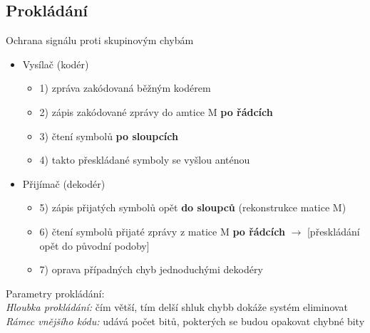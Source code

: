 \subsection{Prokládání}
Ochrana signálu proti skupinovým chybám
\begin{itemize}
	\item Vysílač (kodér)
	\begin{itemize}
		\item 1) zpráva zakódovaná běžným kodérem
		\item 2) zápis zakódované zprávy do amtice M \textbf{po řádcích}
		\item 3) čtení symbolů \textbf{po sloupcích}
		\item 4) takto přeskládané symboly se vyšlou anténou
	\end{itemize}
	\item Přijímač (dekodér)
	\begin{itemize}
		\item 5) zápis přijatých symbolů opět \textbf{do sloupců} (rekonstrukce matice M)
		\item 6) čtení symbolů přijaté zprávy z matice M \textbf{po řádcích} $\rightarrow$ [přeskládání opět do původní podoby]
		\item 7) oprava případných chyb jednoduchými dekodéry
	\end{itemize}
\end{itemize}
Parametry prokládání:\\
\textit{Hloubka prokládání:} čím větší, tím delší shluk chybb dokáže systém eliminovat\\
\textit{Rámec vnějšího kódu:} udává počet bitů, pokterých se budou opakovat chybné bity

